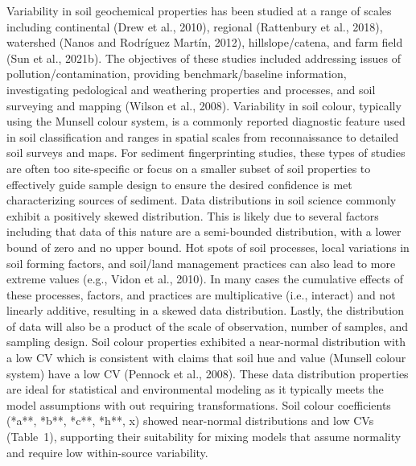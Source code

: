 \documentclass[
  number]{elsarticle}
\begin{document}
Variability in soil geochemical properties has been studied at a range
of scales including continental (Drew et al., 2010), regional
(Rattenbury et al., 2018), watershed (Nanos and Rodríguez Martín, 2012),
hillslope/catena, and farm field (Sun et al., 2021b). The objectives of
these studies included addressing issues of pollution/contamination,
providing benchmark/baseline information, investigating pedological and
weathering properties and processes, and soil surveying and mapping
(Wilson et al., 2008). Variability in soil colour, typically using the
Munsell colour system, is a commonly reported diagnostic feature used in
soil classification and ranges in spatial scales from reconnaissance to
detailed soil surveys and maps. For sediment fingerprinting studies,
these types of studies are often too site-specific or focus on a smaller
subset of soil properties to effectively guide sample design to ensure
the desired confidence is met characterizing sources of sediment. Data
distributions in soil science commonly exhibit a positively skewed
distribution. This is likely due to several factors including that data
of this nature are a semi-bounded distribution, with a lower bound of
zero and no upper bound. Hot spots of soil processes, local variations
in soil forming factors, and soil/land management practices can also
lead to more extreme values (e.g., Vidon et al., 2010). In many cases
the cumulative effects of these processes, factors, and practices are
multiplicative (i.e., interact) and not linearly additive, resulting in
a skewed data distribution. Lastly, the distribution of data will also
be a product of the scale of observation, number of samples, and
sampling design. Soil colour properties exhibited a near-normal
distribution with a low CV which is consistent with claims that soil hue
and value (Munsell colour system) have a low CV (Pennock et al., 2008).
These data distribution properties are ideal for statistical and
environmental modeling as it typically meets the model assumptions with
out requiring transformations. Soil colour coefficients (*a**, *b**,
*c**, *h**, x) showed near-normal distributions and low CVs (Table~1),
supporting their suitability for mixing models that assume normality and
require low within-source variability.
\end{document}
